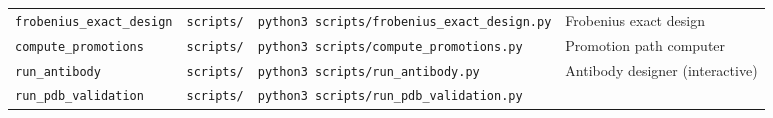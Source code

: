 \begin{longtable}[]{@{}llll@{}}
\begin{minipage}[t]{0.17\columnwidth}
\texttt{frobenius\_exact\_design}\strut
\end{minipage} & \begin{minipage}[t]{0.24\columnwidth}\raggedright
\texttt{scripts/}\strut
\end{minipage} & \begin{minipage}[t]{0.19\columnwidth}\raggedright
\texttt{python3\ scripts/frobenius\_exact\_design.py}\strut
\end{minipage} & \begin{minipage}[t]{0.28\columnwidth}\raggedright
Frobenius exact design\strut
\end{minipage}\tabularnewline
\begin{minipage}[t]{0.17\columnwidth}\raggedright
\texttt{compute\_promotions}\strut
\end{minipage} & \begin{minipage}[t]{0.24\columnwidth}\raggedright
\texttt{scripts/}\strut
\end{minipage} & \begin{minipage}[t]{0.19\columnwidth}\raggedright
\texttt{python3\ scripts/compute\_promotions.py}\strut
\end{minipage} & \begin{minipage}[t]{0.28\columnwidth}\raggedright
Promotion path computer\strut
\end{minipage}\tabularnewline
\begin{minipage}[t]{0.17\columnwidth}\raggedright
\texttt{run\_antibody}\strut
\end{minipage} & \begin{minipage}[t]{0.24\columnwidth}\raggedright
\texttt{scripts/}\strut
\end{minipage} & \begin{minipage}[t]{0.19\columnwidth}\raggedright
\texttt{python3\ scripts/run\_antibody.py}\strut
\end{minipage} & \begin{minipage}[t]{0.28\columnwidth}\raggedright
Antibody designer (interactive)\strut
\end{minipage}\tabularnewline
\begin{minipage}[t]{0.17\columnwidth}\raggedright
\texttt{run\_pdb\_validation}\strut
\end{minipage} & \begin{minipage}[t]{0.24\columnwidth}\raggedright
\texttt{scripts/}\strut
\end{minipage} & \begin{minipage}[t]{0.19\columnwidth}\raggedright
\texttt{python3\ scripts/run\_pdb\_validation.py}\strut

\end{minipage}
\end{longtable}

